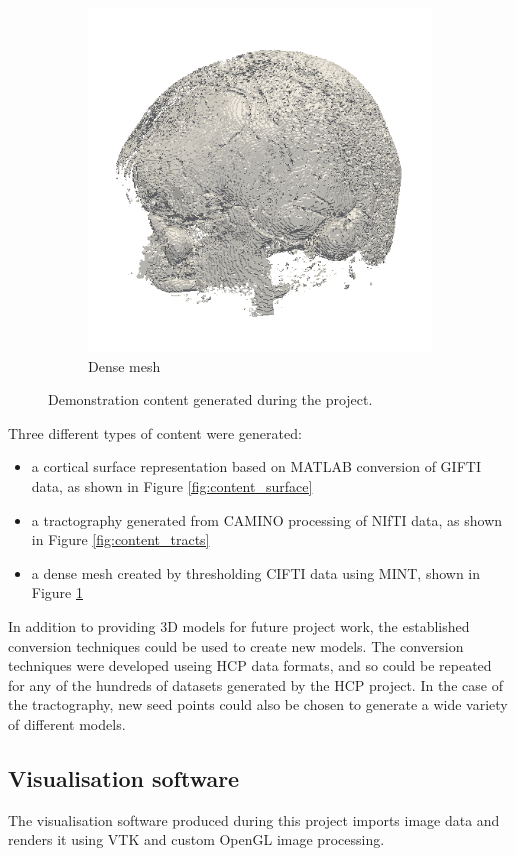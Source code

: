 \documentclass[MSc,paper=a4,pagesize=auto]{icldt}
\begin{document}
\begin{figure}[htbp!]
\centering
\begin{subfigure}{0.3\textwidth}
    \centering
    \includegraphics[width=0.8\linewidth]{resources/content_btain}
    \caption{Dense mesh}
	\label{fig:content_btain}
\end{subfigure}    
    \caption{Demonstration content generated during the project.}
    \label{fig:content_final}
\end{figure}

Three different types of content were generated: 
\begin{itemize}
\item a cortical surface representation based on MATLAB conversion of GIFTI data, as shown in Figure \ref{fig:content_surface}
\item a tractography generated from CAMINO processing of NIfTI data, as shown in Figure \ref{fig:content_tracts}
\item a dense mesh created by thresholding CIFTI data using MINT, shown in Figure \ref{fig:content_btain} 
\end{itemize}

In addition to providing 3D models for future project work, the established conversion techniques could be used to create new models. The conversion techniques were developed useing HCP data formats, and so could be repeated for any of the hundreds of datasets generated by the HCP project. In the case of the tractography, new seed points could also be chosen to generate a wide variety of different models.

\subsection{Visualisation software}
The visualisation software produced during this project imports image data and renders it using VTK and custom OpenGL image processing.
\end{document}
